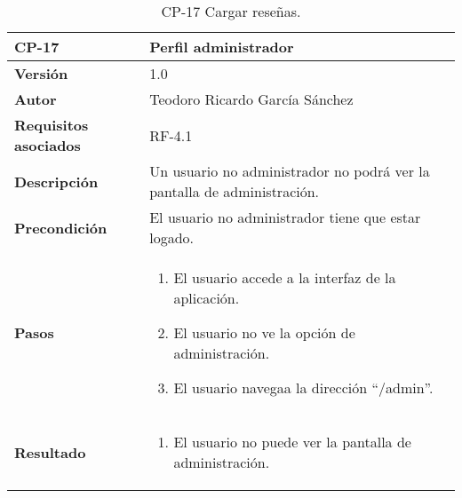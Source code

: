 \begin{table}[p]
	\centering
	\begin{tabularx}{\linewidth}{ p{} p{} }
		\toprule
		\textbf{CP-17}    & \textbf{Perfil administrador}\\
		\toprule
		\textbf{Versión}              & 1.0    \\
		\textbf{Autor}                & Teodoro Ricardo García Sánchez \\
		\textbf{Requisitos asociados} & RF-4.1 \\
		\textbf{Descripción}          & Un usuario no administrador no podrá ver la pantalla de administración. \\
		\textbf{Precondición}         & El usuario no administrador tiene que estar logado. \\
		\textbf{Pasos}             &
		\begin{enumerate}
			\def\labelenumi{\arabic{enumi}.}
			\tightlist
			\item El usuario accede a la interfaz de la aplicación.
			\item El usuario no ve la opción de administración.
			\item El usuario navegaa la dirección ``/admin''.
		\end{enumerate}\\
		\textbf{Resultado}          & 
		\begin{enumerate}
			\item El usuario no puede ver la pantalla de administración.
		\end{enumerate}\\
		\bottomrule
	\end{tabularx}
	\caption{CP-17 Cargar reseñas.}
\end{table}

